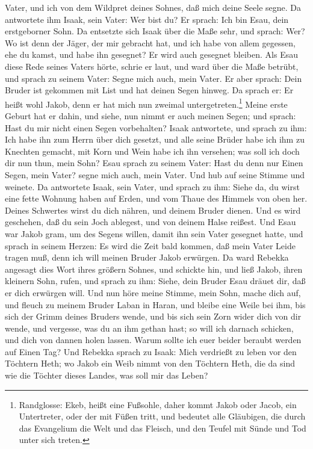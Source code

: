 Vater, und ich von dem Wildpret deines Sohnes, daß mich deine Seele segne. Da antwortete ihm Isaak, sein Vater: Wer bist du? Er sprach: Ich bin Esau, dein erstgeborner Sohn. Da entsetzte sich Isaak über die Maße sehr, und sprach: Wer? Wo ist denn der Jäger, der mir gebracht hat, und ich habe von allem gegessen, ehe du kamst, und habe ihn gesegnet? Er wird auch gesegnet bleiben. Als Esau diese Rede seines Vaters hörte, schrie er laut, und ward über die Maße betrübt, und sprach zu seinem Vater: Segne mich auch, mein Vater. Er aber sprach: Dein Bruder ist gekommen mit List und hat deinen Segen hinweg. Da sprach er: Er heißt wohl Jakob, denn er hat mich nun zweimal untergetreten.\footnote{Randglosse: Ekeb, heißt eine Fußsohle, daher kommt Jakob oder Jacob, ein Untertreter, oder der mit Füßen tritt, und bedeutet alle Gläubigen, die durch das Evangelium die Welt und das Fleisch, und den Teufel mit Sünde und Tod unter sich treten.} Meine erste Geburt hat er dahin, und siehe, nun nimmt er auch meinen Segen; und sprach: Hast du mir nicht einen Segen vorbehalten? Isaak antwortete, und sprach zu ihm: Ich habe ihn zum Herrn über dich gesetzt, und alle seine Brüder habe ich ihm zu Knechten gemacht, mit Korn und Wein habe ich ihn versehen; was soll ich doch dir nun thun, mein Sohn? Esau sprach zu seinem Vater: Hast du denn nur Einen Segen, mein Vater? segne mich auch, mein Vater. Und hub auf seine Stimme und weinete. Da antwortete Isaak, sein Vater, und sprach zu ihm: Siehe da, du wirst eine fette Wohnung haben auf Erden, und vom Thaue des Himmels von oben her. Deines Schwertes wirst du dich nähren, und deinem Bruder dienen. Und es wird geschehen, daß du sein Joch ablegest, und von deinem Halse reißest. Und Esau war Jakob gram, um des Segens willen, damit ihn sein Vater gesegnet hatte, und sprach in seinem Herzen: Es wird die Zeit bald kommen, daß mein Vater Leide tragen muß, denn ich will meinen Bruder Jakob erwürgen. Da ward Rebekka angesagt dies Wort ihres größern Sohnes, und schickte hin, und ließ Jakob, ihren kleinern Sohn, rufen, und sprach zu ihm: Siehe, dein Bruder Esau dräuet dir, daß er dich erwürgen will. Und nun höre meine Stimme, mein Sohn, mache dich auf, und fleuch zu meinem Bruder Laban in Haran, und bleibe eine Weile bei ihm, bis sich der Grimm deines Bruders wende, und bis sich sein Zorn wider dich von dir wende, und vergesse, was du an ihm gethan hast; so will ich darnach schicken, und dich von dannen holen lassen. Warum sollte ich euer beider beraubt werden auf Einen Tag? Und Rebekka sprach zu Isaak: Mich verdrießt zu leben vor den Töchtern Heth; wo Jakob ein Weib nimmt von den Töchtern Heth, die da sind wie die Töchter dieses Landes, was soll mir das Leben?


